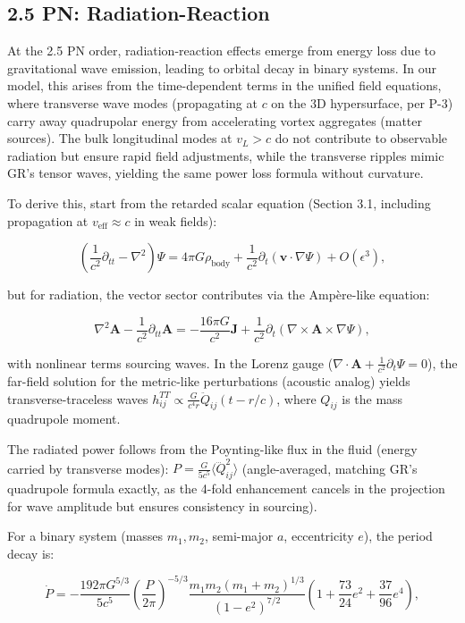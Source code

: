 \subsection{2.5 PN: Radiation-Reaction}

At the 2.5 PN order, radiation-reaction effects emerge from energy loss due to gravitational wave emission, leading to orbital decay in binary systems. In our model, this arises from the time-dependent terms in the unified field equations, where transverse wave modes (propagating at $c$ on the 3D hypersurface, per P-3) carry away quadrupolar energy from accelerating vortex aggregates (matter sources). The bulk longitudinal modes at $v_L > c$ do not contribute to observable radiation but ensure rapid field adjustments, while the transverse ripples mimic GR's tensor waves, yielding the same power loss formula without curvature.

To derive this, start from the retarded scalar equation (Section 3.1, including propagation at $v_{\text{eff}} \approx c$ in weak fields):

\[
\left( \frac{1}{c^2} \partial_{tt} - \nabla^2 \right) \Psi = 4\pi G \rho_{\text{body}} + \frac{1}{c^2} \partial_t (\mathbf{v} \cdot \nabla \Psi) + O(\epsilon^3),
\]

but for radiation, the vector sector contributes via the Ampère-like equation:

\[
\nabla^2 \mathbf{A} - \frac{1}{c^2} \partial_{tt} \mathbf{A} = -\frac{16\pi G}{c^2} \mathbf{J} + \frac{1}{c^2} \partial_t (\nabla \times \mathbf{A} \times \nabla \Psi),
\]

with nonlinear terms sourcing waves. In the Lorenz gauge ($\nabla \cdot \mathbf{A} + \frac{1}{c^2} \partial_t \Psi = 0$), the far-field solution for the metric-like perturbations (acoustic analog) yields transverse-traceless waves $h_{ij}^{TT} \propto \frac{G}{c^4 r} \ddot{Q}_{ij}(t - r/c)$, where $Q_{ij}$ is the mass quadrupole moment.

The radiated power follows from the Poynting-like flux in the fluid (energy carried by transverse modes): $P = \frac{G}{5 c^5} \langle \dddot{Q}_{ij}^2 \rangle$ (angle-averaged, matching GR's quadrupole formula exactly, as the 4-fold enhancement cancels in the projection for wave amplitude but ensures consistency in sourcing).

For a binary system (masses $m_1, m_2$, semi-major $a$, eccentricity $e$), the period decay is:

\[
\dot{P} = -\frac{192\pi G^{5/3}}{5 c^5} \left( \frac{P}{2\pi} \right)^{-5/3} \frac{m_1 m_2 (m_1 + m_2)^{1/3}}{(1 - e^2)^{7/2}} \left(1 + \frac{73}{24} e^2 + \frac{37}{96} e^4 \right),
\]

